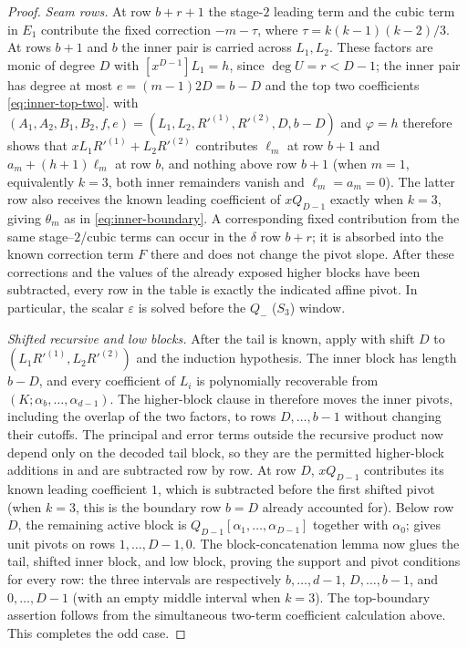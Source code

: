\begin{proof}
      \smallskip\noindent\emph{Seam rows.}
      At row $b+r+1$ the stage-$2$ leading term and
      the cubic term in $E_1$ contribute the fixed correction
      $-m-\tau$, where $\tau=k(k-1)(k-2)/3$.  At rows $b+1$ and $b$ the
      inner pair is carried across $L_1,L_2$.  These factors are monic of
      degree $D$ with $[x^{D-1}]L_1=h$, since $\deg U=r<D-1$; the inner
      pair has degree at most $e=(m-1)2D=b-D$ and the top two coefficients
      \eqref{eq:inner-top-two}.   with
      $(A_1,A_2,B_1,B_2,f,e)=(L_1,L_2,R'^{(1)},R'^{(2)},D,b-D)$ and
      $\varphi=h$ therefore shows that $xL_1R'^{(1)}+L_2R'^{(2)}$
      contributes $\ell_m$ at row $b+1$ and $a_m+(h+1)\ell_m$ at row $b$,
      and nothing above row $b+1$ (when $m=1$, equivalently $k=3$, both
      inner remainders vanish and $\ell_m=a_m=0$).  The latter row also
      receives the known leading coefficient of $xQ_{D-1}$ exactly when
      $k=3$, giving $\theta_m$ as in \eqref{eq:inner-boundary}.  A
      corresponding fixed contribution from the same
      stage--$2$/cubic terms can occur in the $\delta$ row $b+r$; it is
      absorbed into the known correction term $F$ there and does not change
      the pivot slope.  After these corrections and the values of the
      already exposed higher blocks have been subtracted, every row in the
      table is exactly the indicated affine pivot.  In particular, the scalar
      $\varepsilon$ is solved before the $Q_-$ ($S_3$) window.

      \smallskip\noindent\emph{Shifted recursive and low blocks.}
      After the tail is known, apply  with shift
      $D$ to $(L_1R'^{(1)},L_2R'^{(2)})$ and the induction hypothesis.  The
      inner block has length $b-D$, and every coefficient of $L_i$ is
      polynomially recoverable from
      $(K;\alpha_b,\ldots,\alpha_{d-1})$.  The higher-block clause in
       therefore moves the inner pivots, including
      the overlap of the two factors, to rows $D,\ldots,b-1$ without changing
      their cutoffs.  The principal and error terms outside the recursive
      product now depend only on the decoded tail block, so they are the
      permitted higher-block additions in  and are
      subtracted row by row.  At row $D$, $xQ_{D-1}$ contributes its known leading
      coefficient $1$, which is subtracted before the first shifted pivot
      (when $k=3$, this is the boundary row $b=D$ already accounted for).
      Below row $D$, the remaining active block is
      $Q_{D-1}[\alpha_1,\ldots,\alpha_{D-1}]$ together with $\alpha_0$;
       gives unit pivots on rows
      $1,\ldots,D-1,0$.  The block-concatenation lemma now glues the tail,
      shifted inner block, and low block, proving the support and pivot
      conditions
      for every row: the three intervals are respectively
      $b,\ldots,d-1$, $D,\ldots,b-1$, and $0,\ldots,D-1$
      (with an empty middle interval when $k=3$).  The top-boundary assertion
      follows from the simultaneous
      two-term coefficient calculation above.  This completes the odd case.


\end{proof}
